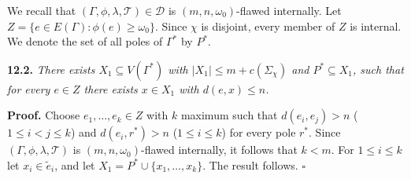 We recall that $(\Gamma, \phi, \lambda, \mathscr{T}) \in \mathscr{D}$ is $(m, n, \omega_0)$-flawed internally. Let $Z = \{e \in E(\Gamma) : \phi(e) \ge \omega_0\}$. Since $\chi$ is disjoint, every member of $Z$ is internal. We denote the set of all poles of $\Gamma^*$ by $P^*$.

\textbf{12.2.} \textit{There exists $X_1 \subseteq V(\Gamma^*)$ with $|X_1| \le m + c(\Sigma_\chi)$ and $P^* \subseteq X_1$, such that for every $e \in Z$ there exists $x \in X_1$ with $d(e, x) \le n$.}

\textbf{Proof.} Choose $e_1, \dots, e_k \in Z$ with $k$ maximum such that $d(e_i, e_j) > n$ ($1 \le i < j \le k$) and $d(e_i, r^*) > n$ ($1 \le i \le k$) for every pole $r^*$. Since $(\Gamma, \phi, \lambda, \mathscr{T})$ is $(m, n, \omega_0)$-flawed internally, it follows that $k < m$. For $1 \le i \le k$ let $x_i \in \tilde{e}_i$, and let $X_1 = P^* \cup \{x_1, \dots, x_k\}$. The result follows. $\square$
